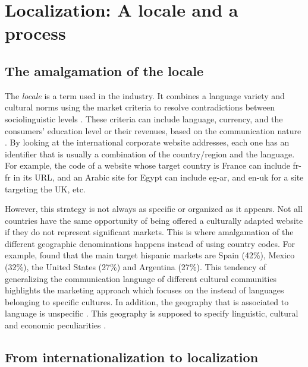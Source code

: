 \documentclass[output=paper]{langsci/langscibook}
\begin{document}
\section{Localization: A locale and a process}

\subsection{The amalgamation of the locale}

The \textit{locale} is a term used in the industry. It combines a language variety and cultural norms using the market criteria to resolve contradictions between sociolinguistic levels \parencite{pym05}. These criteria can include language, currency, and the consumers’ education level or their revenues, based on the communication nature \parencite{pym11}. By looking at the international corporate website addresses, each one has an identifier that is usually a combination of the country/region and the language. For example, the code of a website whose target country is France can include fr-fr in its URL, and an Arabic site for Egypt can include eg-ar, and en-uk for a site targeting the UK, etc.

However, this strategy is not always as specific or organized as it appears. Not all countries have the same opportunity of being offered a culturally adapted website if they do not represent significant markets. This is where amalgamation of the different geographic denominations happens instead of using country codes. For example, \citet{jimenez10} found that the main target hispanic markets are Spain (42\%), Mexico (32\%), the United States (27\%) and Argentina (27\%). This tendency of generalizing the communication language of different cultural communities highlights the marketing approach which focuses on the  instead of languages belonging to specific cultures. In addition, the geography that is associated to language is unspecific \parencite[26--27]{guidere00}. This geography is supposed to specify linguistic, cultural and economic peculiarities \parencite[29]{guidere00}.

\subsection{From internationalization to localization}
\end{document}
